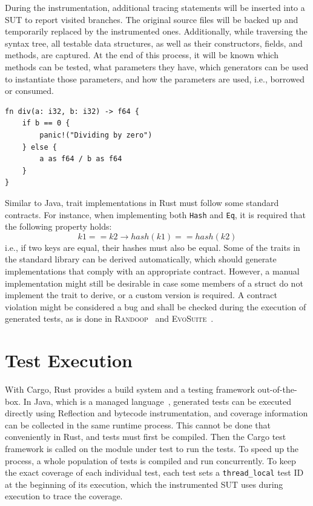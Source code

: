 \documentclass[paper=a4,%
  twoside,%
  BCOR4mm,%
  abstract=true,%
  toc=bibliography,%
  chapterprefix=true,%
  toc=bibliographynumbered,%
  open=right,%
  english,%
  pagesize=pdftex]{scrreprt}
\begin{document}
During the instrumentation, additional tracing statements will be inserted into a \ac{SUT} to report visited branches. The original source files will be backed up and temporarily replaced by the instrumented ones. Additionally, while traversing the syntax tree, all testable data structures, as well as their constructors, fields, and methods, are captured. At the end of this process, it will be known which methods can be tested, what parameters they have, which generators can be used to instantiate those parameters, and how the parameters are used, i.e., borrowed or consumed.

\begin{lstlisting}[style=boxed, caption=Division by zero transformation, label=lst:example-testability-transformation]
fn div(a: i32, b: i32) -> f64 {
    if b == 0 {
        panic!("Dividing by zero")
    } else {
        a as f64 / b as f64
    }
}
\end{lstlisting}

Similar to Java, trait implementations in Rust must follow some standard contracts. For instance, when implementing both \texttt{Hash} and \texttt{Eq}, it is required that the following property holds:
\[
k1 == k2 \longrightarrow hash(k1) == hash(k2)
\]
i.e., if two keys are equal, their hashes must also be equal. Some of the traits in the standard library can be derived automatically, which should generate implementations that comply with an appropriate contract. However, a manual implementation might still be desirable in case some members of a struct do not implement the trait to derive, or a custom version is required. A contract violation might be considered a bug and shall be checked during the execution of generated tests, as is done in \textsc{Randoop}~\cite{Pacheco_2007} and \textsc{EvoSuite}~\cite{Fraser2013}.

\section{Test Execution}
With Cargo, Rust provides a build system and a testing framework out-of-the-box. In Java, which is a managed language~\cite{Gough2005}, generated tests can be executed directly using Reflection and bytecode instrumentation, and coverage information can be collected in the same runtime process. This cannot be done that conveniently in Rust, and tests must first be compiled. Then the Cargo test framework is called on the module under test to run the tests. To speed up the process, a whole population of tests is compiled and run concurrently. To keep the exact coverage of each individual test, each test sets a \texttt{thread\string_local} test ID at the beginning of its execution, which the instrumented \ac{SUT} uses during execution to trace the coverage.
\end{document}
